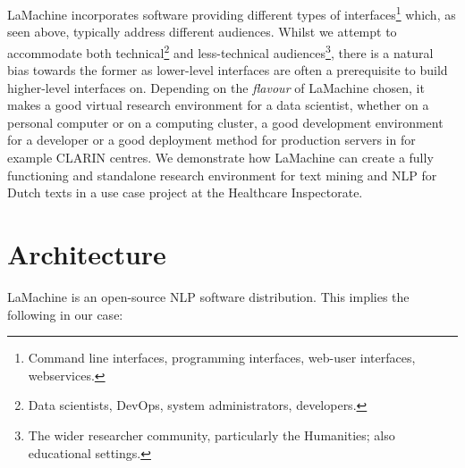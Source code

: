 \documentclass[a4paper,11pt]{article}
\begin{document}
LaMachine incorporates software providing different types of interfaces\footnote{Command line interfaces, programming
interfaces, web-user interfaces, webservices.} which, as seen above, typically address different audiences. Whilst we
attempt to accommodate both technical\footnote{Data scientists, DevOps, system administrators, developers.} and
less-technical audiences\footnote{The wider researcher community, particularly the Humanities; also educational
settings.}, there is a natural bias towards the former as lower-level interfaces are often a prerequisite to build
higher-level interfaces on. Depending on the \emph{flavour} of LaMachine chosen, it makes a good virtual research
environment for a data scientist, whether on a personal computer or on a computing cluster, a good development
environment for a developer or a good deployment method for production servers in for example CLARIN centres.  We
demonstrate how LaMachine can create a fully functioning and standalone research environment for text mining  and NLP
for Dutch texts in a use case project at the Healthcare Inspectorate.


\section{Architecture}

LaMachine is an open-source NLP software distribution. This implies the following in our case:
\end{document}
